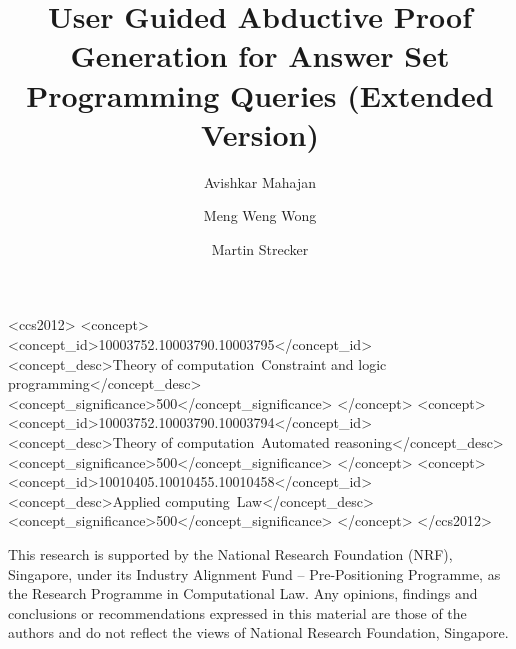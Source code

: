 \documentclass[sigconf]{acmart}
\begin{document}
\title{User Guided Abductive Proof Generation for Answer Set Programming
  Queries (Extended Version)}

\author{Avishkar Mahajan}
\author{Meng Weng Wong}

\author{Martin Strecker}



\begin{CCSXML}
<ccs2012>
   <concept>
       <concept_id>10003752.10003790.10003795</concept_id>
       <concept_desc>Theory of computation~Constraint and logic programming</concept_desc>
       <concept_significance>500</concept_significance>
       </concept>
   <concept>
       <concept_id>10003752.10003790.10003794</concept_id>
       <concept_desc>Theory of computation~Automated reasoning</concept_desc>
       <concept_significance>500</concept_significance>
       </concept>
   <concept>
       <concept_id>10010405.10010455.10010458</concept_id>
       <concept_desc>Applied computing~Law</concept_desc>
       <concept_significance>500</concept_significance>
       </concept>
 </ccs2012>
\end{CCSXML}


\maketitle


















\begin{acks}
This research is supported by the National Research Foundation (NRF),
Singapore, under its Industry Alignment Fund -- Pre-Positioning Programme, as
the Research Programme in Computational Law. Any opinions, findings and
conclusions or recommendations expressed in this material are those of the
authors and do not reflect the views of National Research Foundation,
Singapore.
\end{acks}
  
%



\newpage
\appendix


\end{document}

